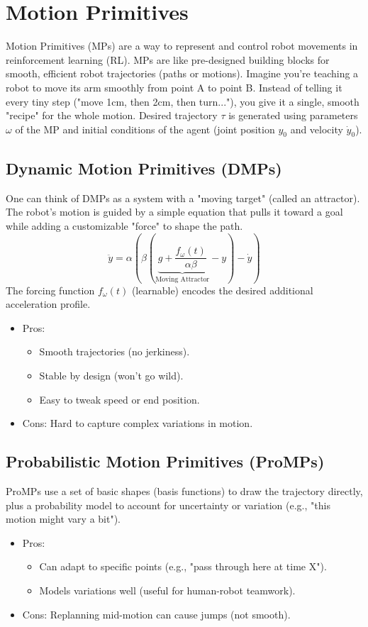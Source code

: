 \section{Motion Primitives}
Motion Primitives (MPs) are a way to represent and control robot movements in reinforcement 
learning (RL). MPs are like pre-designed building blocks for smooth, efficient robot 
trajectories (paths or motions). Imagine you’re teaching a robot to move its arm smoothly 
from point A to point B. Instead of telling it every tiny step ("move 1cm, then 2cm, then 
turn..."), you give it a single, smooth "recipe" for the whole motion. Desired trajectory 
$\tau$ is generated using parameters $\omega$  of the MP and initial conditions of the agent 
(joint position $y_0$  and velocity  $\dot{y}_0$). 

\subsection{Dynamic Motion Primitives (DMPs)}
One can think of DMPs as a system with a "moving target" (called an attractor). The robot’s 
motion is guided by a simple equation that pulls it toward a goal while adding a 
customizable "force" to shape the path.
$$\ddot{y} = \alpha(\beta(\underbrace{g+\frac{f_\omega(t)}{\alpha\beta}}_{\text{Moving Attractor}}-y)-\dot{y})$$
The forcing function $f_\omega(t)$ (learnable) encodes the desired additional acceleration profile.  
\begin{itemize}
    \item Pros: \begin{itemize}
        \item Smooth trajectories (no jerkiness).
        \item Stable by design (won’t go wild).
        \item Easy to tweak speed or end position.
    \end{itemize}
    \item Cons: Hard to capture complex variations in motion.
\end{itemize}

\subsection{Probabilistic Motion Primitives (ProMPs)}
ProMPs use a set of basic shapes (basis functions) to draw the trajectory directly, plus a 
probability model to account for uncertainty or variation (e.g., "this motion might vary a 
bit").
\begin{itemize}
    \item Pros:\begin{itemize}
        \item Can adapt to specific points (e.g., "pass through here at time X").
        \item Models variations well (useful for human-robot teamwork).
    \end{itemize}
    \item Cons: Replanning mid-motion can cause jumps (not smooth).
\end{itemize}

